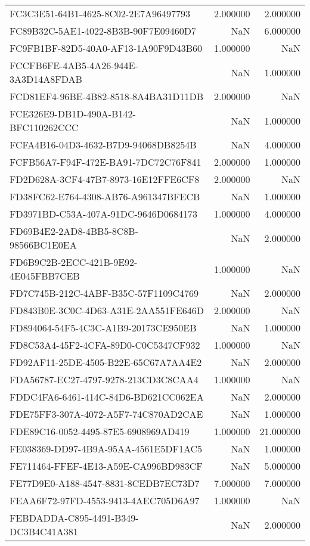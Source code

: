 \begin{tabular}{lrr}
FC3C3E51-64B1-4625-8C02-2E7A96497793 & 2.000000 & 2.000000 \\
FC89B32C-5AE1-4022-8B3B-90F7E09460D7 & NaN & 6.000000 \\
FC9FB1BF-82D5-40A0-AF13-1A90F9D43B60 & 1.000000 & NaN \\
FCCFB6FE-4AB5-4A26-944E-3A3D14A8FDAB & NaN & 1.000000 \\
FCD81EF4-96BE-4B82-8518-8A4BA31D11DB & 2.000000 & NaN \\
FCE326E9-DB1D-490A-B142-BFC110262CCC & NaN & 1.000000 \\
FCFA4B16-04D3-4632-B7D9-94068DB8254B & NaN & 4.000000 \\
FCFB56A7-F94F-472E-BA91-7DC72C76F841 & 2.000000 & 1.000000 \\
FD2D628A-3CF4-47B7-8973-16E12FFE6CF8 & 2.000000 & NaN \\
FD38FC62-E764-4308-AB76-A961347BFECB & NaN & 1.000000 \\
FD3971BD-C53A-407A-91DC-9646D0684173 & 1.000000 & 4.000000 \\
FD69B4E2-2AD8-4BB5-8C8B-98566BC1E0EA & NaN & 2.000000 \\
FD6B9C2B-2ECC-421B-9E92-4E045FBB7CEB & 1.000000 & NaN \\
FD7C745B-212C-4ABF-B35C-57F1109C4769 & NaN & 2.000000 \\
FD843B0E-3C0C-4D63-A31E-2AA551FE646D & 2.000000 & NaN \\
FD894064-54F5-4C3C-A1B9-20173CE950EB & NaN & 1.000000 \\
FD8C53A4-45F2-4CFA-89D0-C0C5347CF932 & 1.000000 & NaN \\
FD92AF11-25DE-4505-B22E-65C67A7AA4E2 & NaN & 2.000000 \\
FDA56787-EC27-4797-9278-213CD3C8CAA4 & 1.000000 & NaN \\
FDDC4FA6-6461-414C-84D6-BD621CC062EA & NaN & 2.000000 \\
FDE75FF3-307A-4072-A5F7-74C870AD2CAE & NaN & 1.000000 \\
FDE89C16-0052-4495-87E5-6908969AD419 & 1.000000 & 21.000000 \\
FE038369-DD97-4B9A-95AA-4561E5DF1AC5 & NaN & 1.000000 \\
FE711464-FFEF-4E13-A59E-CA996BD983CF & NaN & 5.000000 \\
FE77D9E0-A188-4547-8831-8CEDB7EC73D7 & 7.000000 & 7.000000 \\
FEAA6F72-97FD-4553-9413-4AEC705D6A97 & 1.000000 & NaN \\
FEBDADDA-C895-4491-B349-DC3B4C41A381 & NaN & 2.000000 \\

\end{tabular}
